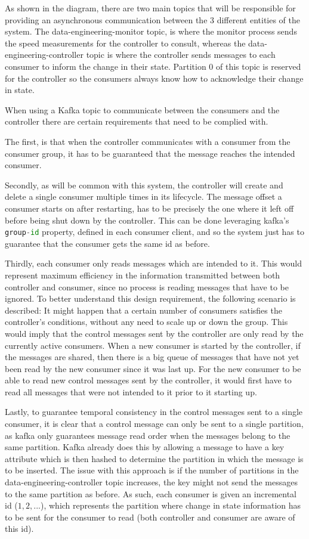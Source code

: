 As shown in the diagram, there are two main topics that will be responsible for providing an asynchronous communication between the 3 different entities of the system. The data-engineering-monitor topic, is where the monitor process sends the speed measurements for the controller to consult, whereas the data-engineering-controller topic is where the controller sends messages to each consumer to inform the change in their state. Partition 0 of this topic is reserved for the controller so the consumers always know how to acknowledge their change in state.

When using a Kafka topic to communicate between the consumers and the controller there are certain requirements that need to be complied with. 

The first, is that when the controller communicates with a consumer from the consumer group, it has to be guaranteed that the message reaches the intended consumer. 

Secondly, as will be common with this system, the controller will create and delete a single consumer multiple times in its lifecycle. The message offset a consumer starts on after restarting, has to be precisely the one where it left off before being shut down by the controller. This can be done leveraging kafka's \lstinline[language=Python]{group-id} property, defined in each consumer client, and so the system just has to guarantee that the consumer gets the same id as before.

Thirdly, each consumer only reads messages which are intended to it. This would represent maximum efficiency in the information transmitted between both controller and consumer, since no process is reading messages that have to be ignored. To better understand this design requirement, the following scenario is described: It might happen that a certain number of consumers satisfies the controller's conditions, without any need to scale up or down the group. This would imply that the control messages sent by the controller are only read by the currently active consumers. When a new consumer is started by the controller, if the messages are shared, then there is a big queue of messages that have not yet been read by the new consumer since it was last up. For the new consumer to be able to read new control messages sent by the controller, it would first have to read all messages that were not intended to it prior to it starting up.

Lastly, to guarantee temporal consistency in the control messages sent to a single consumer, it is clear that a control message can only be sent to a single partition, as kafka only guarantees message read order when the messages belong to the same partition. Kafka already does this by allowing a message to have a key attribute which is then hashed to determine the partition in which the message is to be inserted. The issue with this approach is if the number of partitions in the data-engineering-controller topic increases, the key might not send the messages to the same partition as before. As such, each consumer is given an incremental id ($1, 2, ...$), which represents the partition where change in state information has to be sent for the consumer to read (both controller and consumer are aware of this id).

